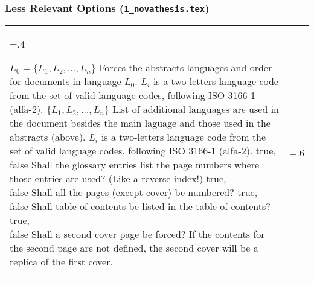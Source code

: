 \subsubsection{Less Relevant Options (\texttt{1\_novathesis.tex})} %
\label{ssub:less_relevant_options_1}


\bgroup
\begin{xltabular}{\linewidth}{>{\hsize=.4\hsize\raggedright\arraybackslash}X>{\hsize=.6\hsize}X}
  \toprule
  {$L_0 = \{L_1, L_2, …, L_n\}$}%
  {Forces the abstracts languages and order for documents in language $L_0$.}%
  {%
    $L_i$ is a two-letters language code from the set of valid language codes, following ISO 3166-1 (alfa-2).
  }
  \midrule
  {$\{L_1, L_2, …, L_n\}$}%
  {List of additional languages are used in the document besides the main laguage and those used in the abstracts (above).}%
  {%
    $L_i$ is a two-letters language code from the set of valid language codes, following ISO 3166-1 (alfa-2).
  }
  \midrule
  {true, \newline false}%
  {Shall the glossary entries list the page numbers where those entries are used?  (Like a reverse index!)}%
  {}
  \midrule
  {true,\newline false }%
  {Shall all the pages (except cover) be numbered?}%
  {}
  \midrule
  {true,\newline false }%
  {Shall table of contents be listed in the table of contents?}%
  {}
  \midrule
  {true,\newline false }%
  {Shall a second cover page be forced?}%
  {If the contents for the second page are not defined, the second cover will be a replica of the first cover.}
  \midrule

\end{xltabular}
